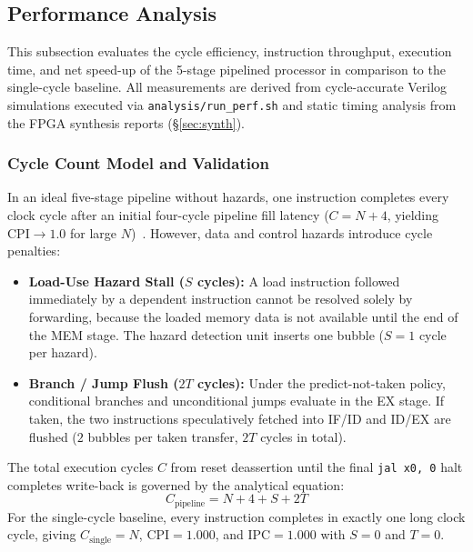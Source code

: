 \subsection{Performance Analysis}
\label{sec:perf}

This subsection evaluates the cycle efficiency, instruction throughput, execution time,
and net speed-up of the 5-stage pipelined processor in comparison to the single-cycle
baseline. All measurements are derived from cycle-accurate Verilog simulations executed
via \texttt{analysis/run\_perf.sh} and static timing analysis from the FPGA synthesis
reports (\S\ref{sec:synth}).

\subsubsection{Cycle Count Model and Validation}
In an ideal five-stage pipeline without hazards, one instruction completes every clock
cycle after an initial four-cycle pipeline fill latency ($C = N + 4$, yielding
$\text{CPI} \to 1.0$ for large $N$)~\cite{vikashPattersonRV}. However, data and control
hazards introduce cycle penalties:
\begin{itemize}
  \item \textbf{Load-Use Hazard Stall ($S$ cycles):} A load instruction followed
        immediately by a dependent instruction cannot be resolved solely by forwarding,
        because the loaded memory data is not available until the end of the MEM stage.
        The hazard detection unit inserts one bubble ($S = 1$ cycle per hazard).
  \item \textbf{Branch / Jump Flush ($2T$ cycles):} Under the predict-not-taken policy,
        conditional branches and unconditional jumps evaluate in the EX stage. If taken,
        the two instructions speculatively fetched into IF/ID and ID/EX are flushed
        ($2$ bubbles per taken transfer, $2T$ cycles in total).
\end{itemize}
The total execution cycles $C$ from reset deassertion until the final \texttt{jal x0, 0}
halt completes write-back is governed by the analytical equation:
\begin{equation}
  C_{\text{pipeline}} = N + 4 + S + 2T
  \label{eq:cycles}
\end{equation}
For the single-cycle baseline, every instruction completes in exactly one long clock
cycle, giving $C_{\text{single}} = N$, $\text{CPI} = 1.000$, and $\text{IPC} = 1.000$
with $S = 0$ and $T = 0$.

